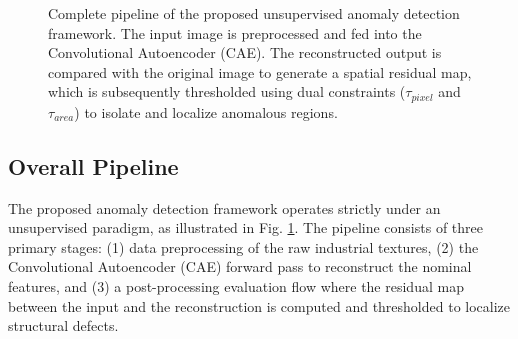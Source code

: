\documentclass[10pt,twocolumn,a4paper]{article}
\begin{document}
\begin{figure}[t]
{%
    } %
    \caption{Complete pipeline of the proposed unsupervised anomaly detection framework. The input image is preprocessed and fed into the Convolutional Autoencoder (CAE). The reconstructed output is compared with the original image to generate a spatial residual map, which is subsequently thresholded using dual constraints ($\tau_{pixel}$ and $\tau_{area}$) to isolate and localize anomalous regions.}
    \label{fig:architecture}
\end{figure}



\subsection{Overall Pipeline}
The proposed anomaly detection framework operates strictly under an unsupervised paradigm, as illustrated in Fig. \ref{fig:architecture}. The pipeline consists of three primary stages: (1) data preprocessing of the raw industrial textures, (2) the Convolutional Autoencoder (CAE) forward pass to reconstruct the nominal features, and (3) a post-processing evaluation flow where the residual map between the input and the reconstruction is computed and thresholded to localize structural defects.
\end{document}

